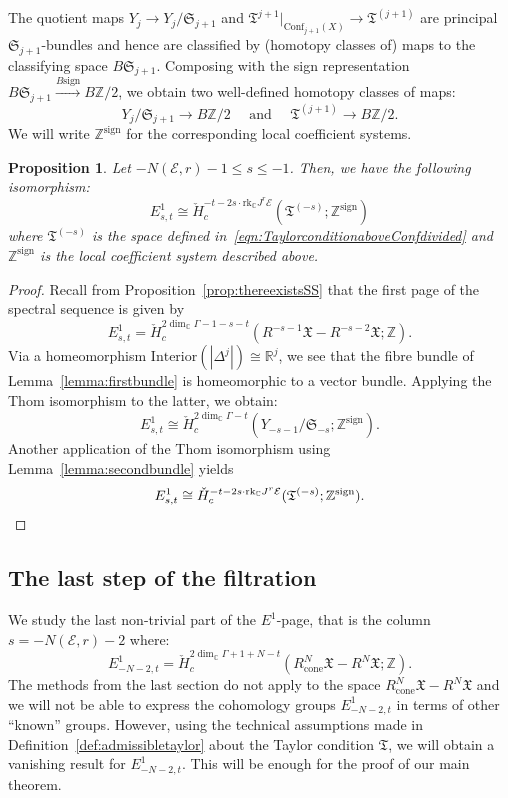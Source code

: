 \documentclass[a4paper]{amsart}
\newcommand{\bZ}{\mathbb Z}
\newcommand{\bR}{\mathbb R}
\newcommand{\bC}{\mathbb C}
\newcommand{\cE}{\mathcal E}
\newcommand{\fX}{\mathfrak X}
\newcommand{\fT}{\mathfrak T}
\newcommand{\lra}{\longrightarrow}
\newcommand{\fS}{\mathfrak S}
\theoremstyle{plain}
\newtheorem{proposition}[theorem]{Proposition}
\theoremstyle{definition}
\newcommand{\CCH}{\check{H}_{c}}
\newcommand{\Conf}{\mathrm{Conf}}
\newcommand{\rank}{\mathrm{rk}}
\begin{document}
The quotient maps $Y_j \to Y_j / \fS_{j+1}$ and $\fT^{j+1}|_{\Conf_{j+1}(X)} \to \fT^{(j+1)}$ are principal $\fS_{j+1}$-bundles and hence are classified by (homotopy classes of) maps to the classifying space $B\fS_{j+1}$. Composing with the sign representation $B\fS_{j+1} \overset{B\mathrm{sign}}{\lra} B\bZ / 2$, we obtain two well-defined homotopy classes of maps:
\[
    Y_j / \fS_{j+1} \lra B\bZ /2 \quad \text{ and } \quad \fT^{(j+1)} \lra B\bZ /2.
\]
We will write $\bZ^\mathrm{sign}$ for the corresponding local coefficient systems.

\begin{proposition}\label{prop:firstpagethomiso}
Let $-N(\cE,r)-1 \leq s \leq -1$. Then, we have the following isomorphism:
\[
    E^1_{s,t} \cong \CCH^{-t - 2s \cdot \rank_\bC J^r\cE}(\fT^{(-s)}; \bZ^\mathrm{sign})
\]
where $\fT^{(-s)}$ is the space defined in~\eqref{eqn:TaylorconditionaboveConfdivided} and $\bZ^\mathrm{sign}$ is the local coefficient system described above.
\end{proposition}

\begin{proof}
Recall from Proposition~\ref{prop:thereexistsSS} that the first page of the spectral sequence is given by
\[
    E^1_{s,t} = \CCH^{2\dim_\bC \Gamma - 1-s-t}(R^{-s-1}\fX - R^{-s-2}\fX; \bZ).
\]
Via a homeomorphism $\mathrm{Interior}\left(|\Delta^j|\right) \cong \bR^j$, we see that the fibre bundle of Lemma~\ref{lemma:firstbundle} is homeomorphic to a vector bundle. Applying the Thom isomorphism to the latter, we obtain:
\[
    E^1_{s,t} \cong \CCH^{2\dim_\bC \Gamma - t}(Y_{-s-1} / \fS_{-s}; \bZ^\mathrm{sign}).
\]
Another application of the Thom isomorphism using Lemma~\ref{lemma:secondbundle} yields
\[
    E^1_{s,t} \cong \CCH^{-t - 2s \cdot \rank_\bC J^r\cE}(\fT^{(-s)}; \bZ^\mathrm{sign}).\qedhere
\]
\end{proof}




\subsection{The last step of the filtration}\label{subsection:laststepfiltration}

We study the last non-trivial part of the $E^1$-page, that is the column $s = -N(\cE,r)-2$ where:
\[
    E^1_{-N-2,t} = \CCH^{2\dim_\bC \Gamma + 1+N - t}(R^N_\text{cone}\fX - R^N\fX; \bZ).
\]
The methods from the last section do not apply to the space $R^N_\text{cone}\fX - R^N\fX$ and we will not be able to express the cohomology groups $E^1_{-N-2,t}$ in terms of other ``known'' groups. However, using the technical assumptions made in Definition~\ref{def:admissibletaylor} about the Taylor condition $\fT$, we will obtain a vanishing result for $E^1_{-N-2,t}$. This will be enough for the proof of our main theorem.
\end{document}
